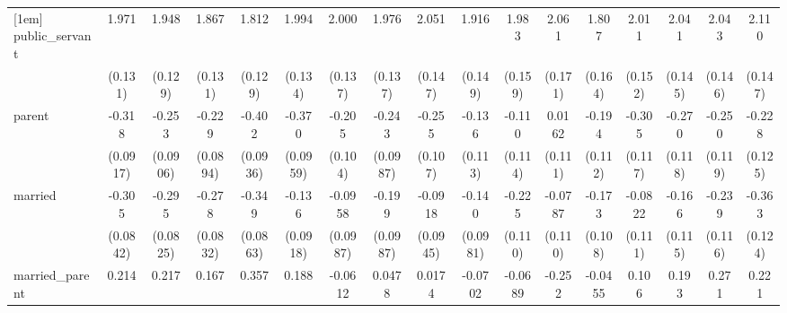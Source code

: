 {\begin{tabular}{l*{16}{c}}
[1em]
public\_servant      &       1.971\sym{***}&       1.948\sym{***}&       1.867\sym{***}&       1.812\sym{***}&       1.994\sym{***}&       2.000\sym{***}&       1.976\sym{***}&       2.051\sym{***}&       1.916\sym{***}&       1.983\sym{***}&       2.061\sym{***}&       1.807\sym{***}&       2.011\sym{***}&       2.041\sym{***}&       2.043\sym{***}&       2.110\sym{***}\\
                    &     (0.131)         &     (0.129)         &     (0.131)         &     (0.129)         &     (0.134)         &     (0.137)         &     (0.137)         &     (0.147)         &     (0.149)         &     (0.159)         &     (0.171)         &     (0.164)         &     (0.152)         &     (0.145)         &     (0.146)         &     (0.147)         \\
[1em]
parent              &      -0.318\sym{***}&      -0.253\sym{**} &      -0.229\sym{*}  &      -0.402\sym{***}&      -0.370\sym{***}&      -0.205\sym{*}  &      -0.243\sym{*}  &      -0.255\sym{*}  &      -0.136         &      -0.110         &      0.0162         &      -0.194         &      -0.305\sym{**} &      -0.270\sym{*}  &      -0.250\sym{*}  &      -0.228         \\
                    &    (0.0917)         &    (0.0906)         &    (0.0894)         &    (0.0936)         &    (0.0959)         &     (0.104)         &    (0.0987)         &     (0.107)         &     (0.113)         &     (0.114)         &     (0.111)         &     (0.112)         &     (0.117)         &     (0.118)         &     (0.119)         &     (0.125)         \\
[1em]
married             &      -0.305\sym{***}&      -0.295\sym{***}&      -0.278\sym{***}&      -0.349\sym{***}&      -0.136         &     -0.0958         &      -0.199\sym{*}  &     -0.0918         &      -0.140         &      -0.225\sym{*}  &     -0.0787         &      -0.173         &     -0.0822         &      -0.166         &      -0.239\sym{*}  &      -0.363\sym{**} \\
                    &    (0.0842)         &    (0.0825)         &    (0.0832)         &    (0.0863)         &    (0.0918)         &    (0.0987)         &    (0.0987)         &    (0.0945)         &    (0.0981)         &     (0.110)         &     (0.110)         &     (0.108)         &     (0.111)         &     (0.115)         &     (0.116)         &     (0.124)         \\
[1em]
married\_parent      &       0.214         &       0.217         &       0.167         &       0.357\sym{**} &       0.188         &     -0.0612         &      0.0478         &      0.0174         &     -0.0702         &     -0.0689         &      -0.252         &     -0.0455         &       0.106         &       0.193         &       0.271         &       0.221         \\

\end{tabular}}
